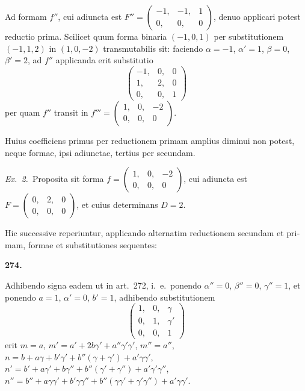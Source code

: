 \documentclass[12pt,a4paper]{article}
\theoremstyle{plain}
\theoremstyle{definition}
\theoremstyle{remark}
\begin{document}
\begin{otherlanguage}{latin}
Ad formam $f''$, cui adiuncta est $F'' = \begin{pmatrix} -1, & -1, & 1 \\ 0, & 0, & 0 \end{pmatrix}$, denuo applicari potest reductio prima. Scilicet quum forma binaria $(-1, 0, 1)$ per substitutionem $(-1, 1, 2)$ in $(1, 0, -2)$ transmutabilis sit: faciendo $\alpha = -1$, $\alpha' = 1$, $\beta = 0$, $\beta' = 2$, ad $f''$ applicanda erit substitutio
\[
\begin{pmatrix} -1, & 0, & 0 \\ 1, & 2, & 0 \\ 0, & 0, & 1 \end{pmatrix}
\]
per quam $f''$ transit in $f''' = \begin{pmatrix} 1, & 0, & -2 \\ 0, & 0, & 0 \end{pmatrix}$.

Huius coefficiens primus per reductionem primam amplius diminui non potest, neque formae, ipsi adiunctae, tertius per secundam.

\textit{Ex.\ 2.}\ Proposita sit forma $f = \begin{pmatrix} 1, & 0, & -2 \\ 0, & 0, & 0 \end{pmatrix}$, cui adiuncta est $F = \begin{pmatrix} 0, & 2, & 0 \\ 0, & 0, & 0 \end{pmatrix}$, et cuius determinans $D = 2$.

Hic successive reperiuntur, applicando alternatim reductionem secundam et primam, formae et substitutiones sequentes:

\bigskip

\textbf{274.}

Adhibendo signa eadem ut in art.\ 272, i.\ e.\ ponendo $\alpha'' = 0$, $\beta'' = 0$, $\gamma'' = 1$, et ponendo $a = 1$, $\alpha' = 0$, $b' = 1$, adhibendo substitutionem
\[
\begin{pmatrix} 1, & 0, & \gamma \\ 0, & 1, & \gamma' \\ 0, & 0, & 1 \end{pmatrix}
\]
erit $m = a$, $m' = a' + 2b\gamma' + a''\gamma'\gamma'$, $m'' = a''$, $n = b + a\gamma + b'\gamma' + b''(\gamma + \gamma') + a'\gamma\gamma'$, $n' = b' + a\gamma' + b\gamma'' + b''(\gamma' + \gamma'') + a'\gamma'\gamma''$, $n'' = b'' + a\gamma\gamma' + b'\gamma\gamma'' + b''(\gamma\gamma' + \gamma'\gamma'') + a'\gamma\gamma'$.


\end{otherlanguage}
\end{document}
